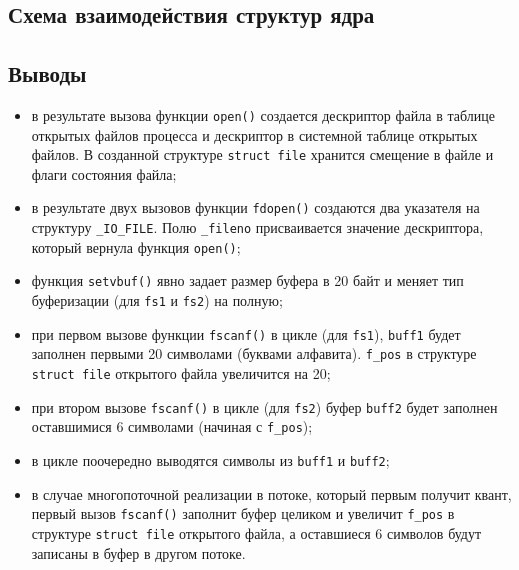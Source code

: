 
\subsection{Схема взаимодействия структур ядра}


\subsection*{Выводы}

\begin{itemize}
	\item в результате вызова функции \texttt{open()} создается дескриптор файла в таблице открытых файлов процесса и дескриптор в системной таблице открытых файлов. В созданной структуре \texttt{struct file} хранится смещение в файле и флаги состояния файла;
	
	\item в результате двух вызовов функции \texttt{fdopen()} создаются два указателя на структуру \texttt{\_IO\_FILE}. Полю \texttt{\_fileno} присваивается значение дескриптора, который вернула функция \texttt{open()};
	
	\item функция \texttt{setvbuf()} явно задает размер буфера в 20 байт и меняет тип буферизации (для \texttt{fs1} и \texttt{fs2}) на полную;
	
	\item при первом вызове функции \texttt{fscanf()} в цикле (для \texttt{fs1}), \texttt{buff1} будет заполнен первыми 20 символами (буквами алфавита). \texttt{f\_pos} в структуре \texttt{struct file} открытого файла увеличится на 20;
	
	\item при втором вызове \texttt{fscanf()} в цикле (для \texttt{fs2}) буфер \texttt{buff2} будет заполнен оставшимися 6 символами (начиная с \texttt{f\_pos});
	
	\item в цикле поочередно выводятся символы из \texttt{buff1} и \texttt{buff2};
	
	\item в случае многопоточной реализации в потоке, который первым получит квант, первый вызов \texttt{fscanf()} заполнит буфер целиком и увеличит \texttt{f\_pos} в структуре \texttt{struct file} открытого файла, а оставшиеся 6 символов будут записаны в буфер в другом потоке.
\end{itemize}

